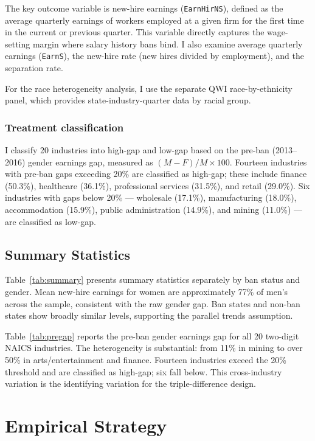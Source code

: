 \documentclass[12pt]{article}
\begin{document}
The key outcome variable is new-hire earnings (\texttt{EarnHirNS}), defined as the average quarterly earnings of workers employed at a given firm for the first time in the current or previous quarter. This variable directly captures the wage-setting margin where salary history bans bind. I also examine average quarterly earnings (\texttt{EarnS}), the new-hire rate (new hires divided by employment), and the separation rate.

For the race heterogeneity analysis, I use the separate QWI race-by-ethnicity panel, which provides state-industry-quarter data by racial group.

\subsubsection*{Treatment classification} I classify 20 industries into high-gap and low-gap based on the pre-ban (2013--2016) gender earnings gap, measured as $(M - F) / M \times 100$. Fourteen industries with pre-ban gaps exceeding 20\% are classified as high-gap; these include finance (50.3\%), healthcare (36.1\%), professional services (31.5\%), and retail (29.0\%). Six industries with gaps below 20\% --- wholesale (17.1\%), manufacturing (18.0\%), accommodation (15.9\%), public administration (14.9\%), and mining (11.0\%) --- are classified as low-gap.

\subsection{Summary Statistics}



Table~\ref{tab:summary} presents summary statistics separately by ban status and gender. Mean new-hire earnings for women are approximately 77\% of men's across the sample, consistent with the raw gender gap. Ban states and non-ban states show broadly similar levels, supporting the parallel trends assumption.



Table~\ref{tab:pregap} reports the pre-ban gender earnings gap for all 20 two-digit NAICS industries. The heterogeneity is substantial: from 11\% in mining to over 50\% in arts/entertainment and finance. Fourteen industries exceed the 20\% threshold and are classified as high-gap; six fall below. This cross-industry variation is the identifying variation for the triple-difference design.

\section{Empirical Strategy}
\label{sec:strategy}
\end{document}
